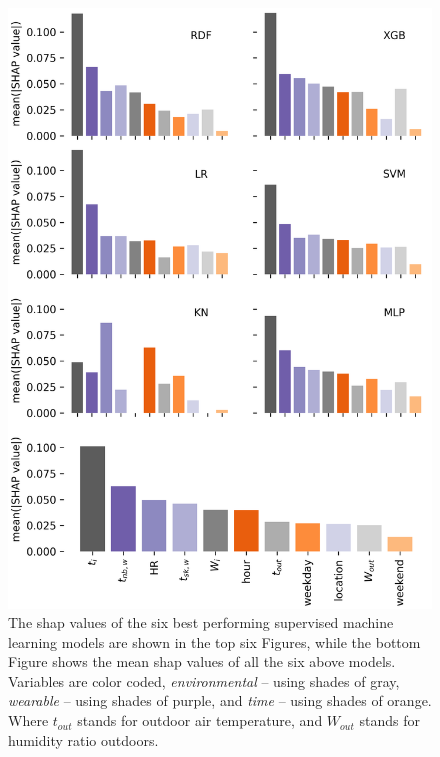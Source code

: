 \documentclass[]{article}
\begin{document}
\begin{figure}[thbp!]
    \centering
    \includegraphics[width=\textwidth]{figures/figure_a3}
    \caption{The \gls{shap} values of the six best performing supervised machine learning models are shown in the top six Figures, while the bottom Figure shows the mean \gls{shap} values of all the six above models.
    Variables are color coded, \emph{environmental} -- using shades of gray, \emph{wearable} -- using shades of purple, and \emph{time} -- using shades of orange.
    Where $t_{out}$ stands for outdoor air temperature, and $W_{out}$ stands for humidity ratio outdoors.}
    \label{fig:shapely_all}
\end{figure}

    \printbibliography
\end{document}
